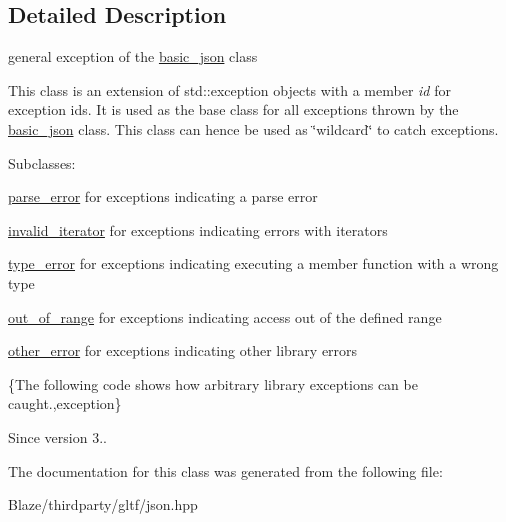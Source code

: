 \subsection{Detailed Description}
general exception of the \hyperlink{classnlohmann_1_1basic__json}{basic\+\_\+json} class 

This class is an extension of {\ttfamily std\+::exception} objects with a member {\itshape id} for exception ids. It is used as the base class for all exceptions thrown by the \hyperlink{classnlohmann_1_1basic__json}{basic\+\_\+json} class. This class can hence be used as \char`\"{}wildcard\char`\"{} to catch exceptions.

Subclasses\+:
\begin{DoxyItemize}
\item \hyperlink{classnlohmann_1_1detail_1_1parse__error}{parse\+\_\+error} for exceptions indicating a parse error
\item \hyperlink{classnlohmann_1_1detail_1_1invalid__iterator}{invalid\+\_\+iterator} for exceptions indicating errors with iterators
\item \hyperlink{classnlohmann_1_1detail_1_1type__error}{type\+\_\+error} for exceptions indicating executing a member function with a wrong type
\item \hyperlink{classnlohmann_1_1detail_1_1out__of__range}{out\+\_\+of\+\_\+range} for exceptions indicating access out of the defined range
\item \hyperlink{classnlohmann_1_1detail_1_1other__error}{other\+\_\+error} for exceptions indicating other library errors
\end{DoxyItemize}

\{The following code shows how arbitrary library exceptions can be caught.,exception\}

\begin{DoxySince}{Since}
version 3.. 
\end{DoxySince}


The documentation for this class was generated from the following file\+:\begin{DoxyCompactItemize}
\item 
Blaze/thirdparty/gltf/json.\+hpp\end{DoxyCompactItemize}
